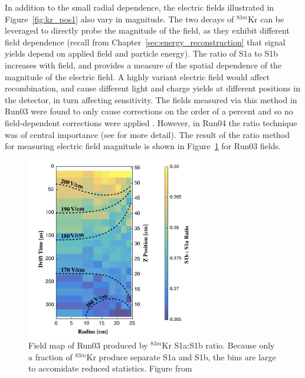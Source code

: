 In addition to the small radial dependence, the electric fields illustrated in Figure~\ref{fig:kr_pos1} also vary in magnitude. The two decays of $^{83m}$Kr can be leveraged to directly probe the magnitude of the field, as they exhibit different field dependence (recall from Chapter~\ref{sec:energy_reconstruction} that signal yields depend on applied field and particle energy). The ratio of S1a to S1b increases with field, and provides a measure of the spatial dependence of the magnitude of the electric field. A highly variant electric field would affect recombination, and cause different light and charge yields at different positions in the detector, in turn affecting sensitivity. The fields measured via this method in Run03 were found to only cause corrections on the order of a percent and so no field-dependent corrections were applied \cite{LUXKr}. However, in Run04 the ratio technique was of central importance (see \cite{LUXCombinedExposure} \cite{LUXFields} \cite{LUXKr} for more detail). The result of the ratio method for measuring electric field magnitude is shown in Figure~\ref{fig:kr_3} for Run03 fields.

\begin{figure}[htbp]
\begin{center}
\includegraphics[width=0.69\textwidth]{figures/lux/kr_3.png}
\caption{Field map of Run03 produced by $^{83m}$Kr S1a:S1b ratio. Because only a fraction of $^{83m}$Kr produce separate S1a and S1b, the bins are large to accomidate reduced statistics. Figure from \cite{LUXKr} }
\label{fig:kr_3}
\end{center}
\end{figure}

